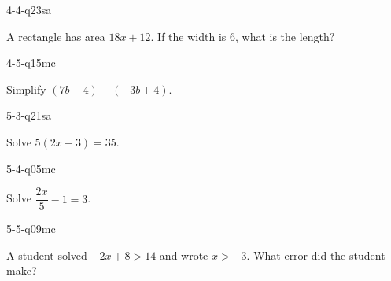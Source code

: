 \begin{practiceQuestion}{4-4-q23}{sa}
\begin{questionText}
A rectangle has area $18x + 12$. If the width is $6$, what is the length?
\end{questionText}
\end{practiceQuestion}

\begin{practiceQuestion}{4-5-q15}{mc}
\begin{questionText}
Simplify $(7b - 4) + (-3b + 4)$.
\end{questionText}
\end{practiceQuestion}

\begin{practiceQuestion}{5-3-q21}{sa}
\begin{questionText}
Solve $5(2x - 3) = 35$.
\end{questionText}
\end{practiceQuestion}

\begin{practiceQuestion}{5-4-q05}{mc}
\begin{questionText}
Solve $\dfrac{2x}{5} - 1 = 3$.
\end{questionText}
\end{practiceQuestion}

\begin{practiceQuestion}{5-5-q09}{mc}
\begin{questionText}
A student solved $-2x + 8 > 14$ and wrote $x > -3$. What error did the student make?
\end{questionText}
\end{practiceQuestion}

